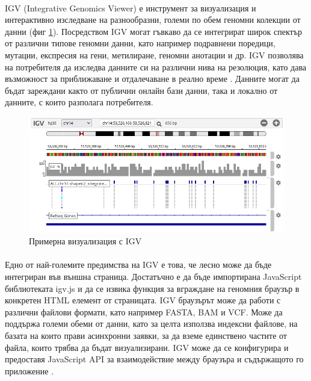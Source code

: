 \documentclass[pdftex,cyrillic,14pt,a4page,twoside,openright]{extreport}
\begin{document}
\paragraph{}
IGV (Integrative Genomics Viewer) е инструмент за визуализация и интерактивно изследване на разнообразни, големи по обем геномни колекции от данни (фиг \ref{fig:igv_example}). Посредством IGV могат гъвкаво да се интегрират широк спектър от различни типове геномни данни, като например подравнени поредици, мутации, експресия на гени, метилиране, геномни анотации и др. IGV позволява на потребителя да изследва данните си на различни нива на резолюция, като дава възможност за приближаване и отдалечаване в реално време \cite{robinson2011}\cite{robinson2017}. Данните могат да бъдат зареждани както от публични онлайн бази данни, така и локално от данните, с които разполага потребителя.

\begin{figure}[h]
  \centering
  \includegraphics[width=17cm]{figures/igv_example}
  \caption {Примерна визуализация с IGV}
  \label{fig:igv_example}
\end{figure}

\paragraph{}
Едно от най-големите предимства на IGV е това, че лесно може да бъде интегриран във външна страница. Достатъчно е да бъде импортирана JavaScript библиотеката igv.js и да се извика функция за вграждане на геномния браузър в конкретен HTML елемент от страницата. IGV браузърът може да работи с различни файлови формати, като например FASTA, BAM и VCF. Може да поддържа големи обеми от данни, като за целта използва индексни файлове, на базата на които прави асинхронни заявки, за да вземе единствено частите от файла, които трябва да бъдат визуализирани. IGV може да се конфигурира и предоставя JavaScript API за взаимодействие между браузъра и съдържащото го приложение \cite{robinson2020}.
\end{document}
